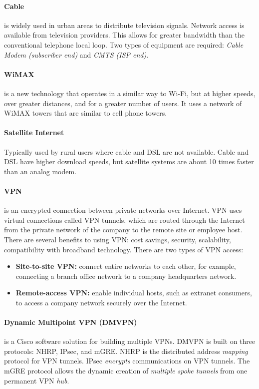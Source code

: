 \paragraph{Cable} is widely used in urban areas to distribute television signals. Network access is available from television providers. This allows for greater bandwidth than the conventional telephone local loop. Two types of equipment are required: \emph{Cable Modem (subscriber end)} and \emph{CMTS (ISP end)}.

\paragraph{WiMAX} is a new technology that operates in a similar way to Wi-Fi, but at higher speeds, over greater distances, and for a greater number of users. It uses a network of WiMAX towers that are similar to cell phone towers. 

\paragraph{Satellite Internet}Typically used by rural users where cable and DSL are not available. Cable and DSL have higher download speeds, but satellite systems are about 10 times faster than an analog modem. 

\paragraph{VPN}is an encrypted connection between private networks over Internet. VPN uses virtual connections called VPN tunnels, which are routed through the Internet from the private network of the company to the remote site or employee host. There are several benefits to using VPN: cost savings, security, scalability, compatibility with broadband technology. There are two types of VPN access: 

\begin{itemize}
\item \textbf{Site-to-site VPN:} connect entire networks to each other, for example, connecting a branch
office network to a company headquarters network. 
\item \textbf{Remote-access VPN:} enable individual hosts, such as  extranet consumers, to access a company network securely over the Internet.
\end{itemize}

\paragraph{Dynamic Multipoint VPN (DMVPN)} is a Cisco software solution for building multiple VPNs. DMVPN is built on three protocols: NHRP, IPsec, and mGRE. NHRP is the distributed address \emph{mapping} protocol for VPN tunnels. IPsec \emph{encrypts} communications on VPN tunnels. The mGRE protocol allows the dynamic creation of \emph{multiple spoke tunnels} from one permanent VPN \emph{hub}.